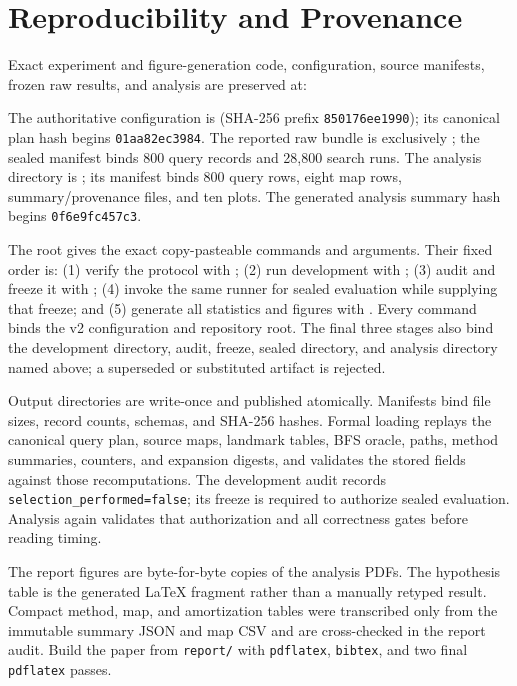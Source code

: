 \section{Reproducibility and Provenance}
\label{sec:reproducibility}

Exact experiment and figure-generation code, configuration, source manifests,
frozen raw results, and analysis are preserved at:

\begin{center}
\end{center}

The authoritative configuration is
 (SHA-256 prefix
\texttt{850176ee1990}); its canonical plan hash begins
\texttt{01aa82ec3984}.  The reported raw bundle is exclusively
; the sealed manifest binds
800 query records and 28,800 search runs.  The analysis directory is
; its manifest binds 800
query rows, eight map rows, summary/provenance files, and ten plots.  The
generated analysis summary hash begins \texttt{0f6e9fc457c3}.

The root  gives the exact copy-pasteable commands and arguments.
Their fixed order is: (1) verify the protocol with
; (2) run development
with ; (3) audit and freeze it with
; (4) invoke the same
runner for sealed evaluation while supplying that freeze; and (5) generate all
statistics and figures with .
Every command binds the v2 configuration and repository root.  The final three
stages also bind the development directory, audit, freeze, sealed directory,
and analysis directory named above; a superseded or substituted artifact is
rejected.

Output directories are write-once and published atomically.  Manifests bind
file sizes, record counts, schemas, and SHA-256 hashes.  Formal loading replays
the canonical query plan, source maps, landmark tables, BFS oracle, paths,
method summaries, counters, and expansion digests, and validates the stored
fields against those recomputations.  The development audit records
\texttt{selection\_performed=false}; its freeze is required to authorize
sealed evaluation.  Analysis again validates that authorization and all
correctness gates before reading timing.

The report figures are byte-for-byte copies of the analysis PDFs.  The
hypothesis table is the generated \LaTeX{} fragment rather than a manually
retyped result.  Compact method, map, and amortization tables were transcribed
only from the immutable summary JSON and map CSV and are cross-checked in the
report audit.  Build the paper from \texttt{report/} with
\texttt{pdflatex}, \texttt{bibtex}, and two final \texttt{pdflatex} passes.
